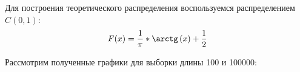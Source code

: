 \documentclass{article}
\begin{document}
Для построения теоретического распределения воспользуемся распределением $C(0, 1)$:
\[F(x) = \frac{1}{\pi}*\arctg\left(x\right)+\frac{1}{2}\]

Рассмотрим полученные графики для выборки длины 100 и 100000:

\begin{figure}[h]
\end{figure}
\end{document}
